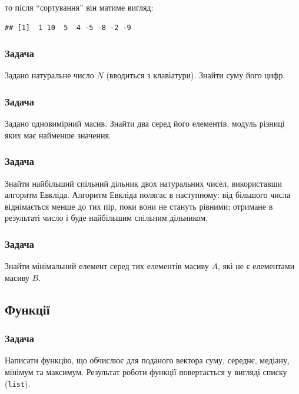 \documentclass[
]{book}
\begin{document}
то після ``сортування'' він матиме вигляд:

\begin{verbatim}
## [1]  1 10  5  4 -5 -8 -2 -9
\end{verbatim}

\hypertarget{task6115}{%
\subsubsection{Задача}\label{task6115}}

Задано натуральне число \(N\) (вводиться з клавіатури). Знайти суму його цифр.

\hypertarget{task6116}{%
\subsubsection{Задача}\label{task6116}}

Задано одновимірний масив. Знайти два серед його елементів, модуль різниці яких має
найменше значення.

\hypertarget{task6117}{%
\subsubsection{Задача}\label{task6117}}

Знайти найбільший спільний дільник двох натуральних чисел, використавши алгоритм
Евкліда. Алгоритм Евкліда полягає в наступному: від більшого числа віднімається менше до тих пір,
поки вони не стануть рівними; отримане в результаті число і буде найбільшим спільним дільником.

\hypertarget{task6118}{%
\subsubsection{Задача}\label{task6118}}

Знайти мінімальний елемент серед тих елементів масиву \(A\), які не є елементами масиву \(B\).

\hypertarget{chapter612}{%
\subsection{Функції}\label{chapter612}}

\hypertarget{task6121}{%
\subsubsection{Задача}\label{task6121}}

Написати функцію, що обчислює для поданого вектора суму, середнє, медіану, мінімум та максимум. Результат роботи функції повертається у вигляді списку (\texttt{list}).
\end{document}
